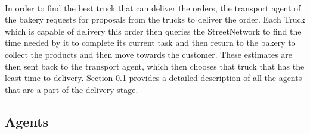 \documentclass[11pt, a4paper]{article}
\begin{document}
\paragraph{}
In order to find the best truck that can deliver the orders, the transport agent of the bakery requests for proposals from the trucks to deliver the order. Each Truck which is capable of delivery this order then queries the StreetNetwork to find the time needed by it to complete its current task and then return to the bakery to collect the products and then move towards the customer. These estimates are then sent back to the transport agent, which then chooses that truck that has the least time to delivery.  Section \ref{DeliveryAgents} provides a detailed description of all the agents that are a part of the delivery stage.

\subsection{Agents}\label{DeliveryAgents}
\end{document}
